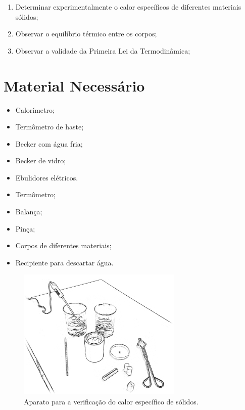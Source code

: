 \begin{enumerate}
	\item Determinar experimentalmente o calor específicos de diferentes materiais sólidos;
	\item Observar o equilíbrio térmico entre os corpos;
	\item Observar a validade da Primeira Lei da Termodinâmica;
\end{enumerate}

\section{Material Necessário}

\begin{itemize}
	\item Calorímetro;
	\item Termômetro de haste;
	\item Becker com água fria;
	\item Becker de vidro;
	\item Ebulidores elétricos.
	\item Termômetro;
	\item Balança;
	\item Pinça;
	\item Corpos de diferentes materiais;
	\item Recipiente para descartar água.
\end{itemize}

\begin{figure}[!hbt]
	\centering
	\includegraphics[width=0.7\textwidth]{Ilustrations/AparatoCalorEspecifico}
	\caption{Aparato para a verificação do calor específico de sólidos.}
\end{figure}

